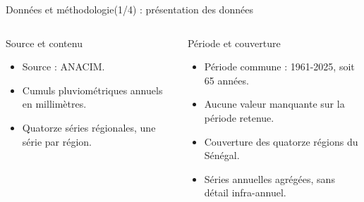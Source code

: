 \documentclass[aspectratio=169,11pt]{beamer}
\begin{document}
\begin{frame}{Données et méthodologie(1/4) : présentation des données}
  \begin{columns}[T,onlytextwidth]
      \begin{block}{Source et contenu}
        \small
        \begin{itemize}
          \item Source : ANACIM.
          \item Cumuls pluviométriques annuels en millimètres.
          \item Quatorze séries régionales, une série par région.
        \end{itemize}
      \end{block}
      \begin{block}{Période et couverture}
        \small
        \begin{itemize}
          \item Période commune : 1961-2025, soit 65 années.
          \item Aucune valeur manquante sur la période retenue.
          \item Couverture des quatorze régions du Sénégal.
          \item Séries annuelles agrégées, sans détail infra-annuel.
        \end{itemize}
      \end{block}
  \end{columns}
\end{frame}
\end{document}
